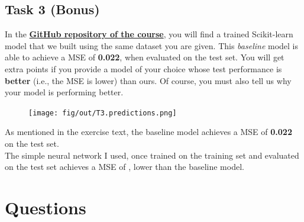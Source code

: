 \documentclass[tikz,14pt,fleqn]{article}
\begin{document}
\subsection{Task 3 (Bonus)}

In the \href{https://github.com/GiorgiaAuroraAdorni/ML-bachelor-course-assignments-sp23}{\textbf{GitHub repository of the course}}, you will find a trained Scikit-learn model that we built using the same dataset you are given. 
This \textit{baseline} model is able to achieve a MSE of \textbf{0.022}, when evaluated on the test set. 
You will get extra points if you provide a model of your choice whose test performance is \textbf{better} (i.e., the MSE is lower) than ours. Of course, you must also tell us why your model is performing better.
\begin{figure}
    \centering
    \texttt{[image: fig/out/T3.predictions.png]}
    \vspace{-1.5cm}
    \label{fig:1.1}
\end{figure}
As mentioned in the exercise text, the baseline model achieves a MSE of \textbf{0.022} on the test set. \\ The simple neural network I used, once trained on the training set and evaluated on the test set achieves a MSE of \textbf{}, lower than the baseline model.\\
\section{Questions}
\end{document}
